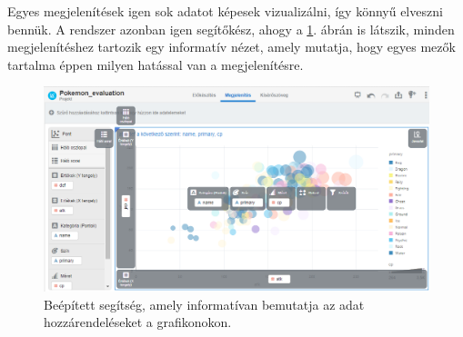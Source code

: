 	Egyes megjelenítések igen sok adatot képesek vizualizálni, így könnyű elveszni bennük. A rendszer azonban igen segítőkész, ahogy a \ref{fig:pokedataexplain}. ábrán is látszik, minden megjelenítéshez tartozik egy informatív nézet, amely mutatja, hogy egyes mezők tartalma éppen milyen hatással van a megjelenítésre.	
	\begin{figure}[h!]
		\centering
		\includegraphics[width=0.7\linewidth]{dani_imgs/poke_data_explain}
		\caption{Beépített segítség, amely informatívan bemutatja az adat hozzárendeléseket a grafikonokon.}
		\label{fig:pokedataexplain}
	\end{figure}

	
